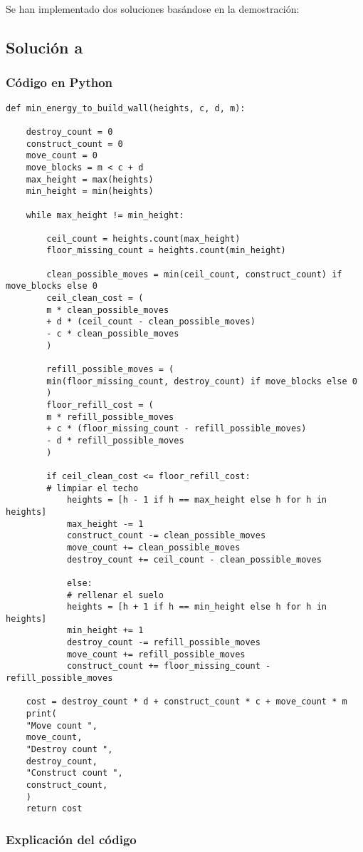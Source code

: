 \documentclass[a4paper,12pt]{article}
\begin{document}
Se han implementado dos soluciones basándose en la demostración:

\subsection{Solución a}

\subsubsection{Código en Python}
\begin{lstlisting}
def min_energy_to_build_wall(heights, c, d, m):

	destroy_count = 0
	construct_count = 0
	move_count = 0
	move_blocks = m < c + d
	max_height = max(heights)
	min_height = min(heights)

	while max_height != min_height:

		ceil_count = heights.count(max_height)
		floor_missing_count = heights.count(min_height)

		clean_possible_moves = min(ceil_count, construct_count) if move_blocks else 0
		ceil_clean_cost = (
		m * clean_possible_moves
		+ d * (ceil_count - clean_possible_moves)
		- c * clean_possible_moves
		)

		refill_possible_moves = (
		min(floor_missing_count, destroy_count) if move_blocks else 0
		)
		floor_refill_cost = (
		m * refill_possible_moves
		+ c * (floor_missing_count - refill_possible_moves)
		- d * refill_possible_moves
		)

		if ceil_clean_cost <= floor_refill_cost:
		# limpiar el techo
			heights = [h - 1 if h == max_height else h for h in heights]
			max_height -= 1
			construct_count -= clean_possible_moves
			move_count += clean_possible_moves
			destroy_count += ceil_count - clean_possible_moves

			else:
			# rellenar el suelo
			heights = [h + 1 if h == min_height else h for h in heights]
			min_height += 1
			destroy_count -= refill_possible_moves
			move_count += refill_possible_moves
			construct_count += floor_missing_count - refill_possible_moves

	cost = destroy_count * d + construct_count * c + move_count * m
	print(
	"Move count ",
	move_count,
	"Destroy count ",
	destroy_count,
	"Construct count ",
	construct_count,
	)
	return cost
\end{lstlisting}

\subsubsection{Explicación del código}
\end{document}
